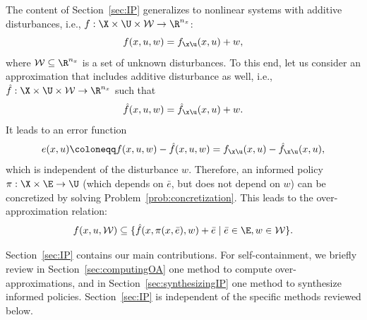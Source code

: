 \documentclass[letterpaper, 10 pt, conference]{ieeeconf}  %
\begin{document}
\begin{remark}
The content of Section~\ref{sec:IP} generalizes to nonlinear systems with additive disturbances, i.e., $f:\X\times\U\times\mathcal{W}\rightarrow\R^{n_x}$:
$$
f(x,u,w)= f_{\x\u}(x,u)+w,
$$
where $\mathcal{W}\subseteq\R^{n_x}$ is a set of unknown disturbances. To this end, let us consider an approximation that includes additive disturbance as well, i.e., $\hat{f}:\X\times\U\times\mathcal{W}\rightarrow\R^{n_x}$ such that
$$
\hat{f}(x,u,w)= \hat{f}_{\x\u}(x,u)+w.
$$
It leads to an error function
$$
e(x,u)\coloneqq f(x,u,w)-\hat{f}(x,u,w) = f_{\x\u}(x,u) - \hat{f}_{\x\u}(x,u),
$$
which is independent of the disturbance $w$. Therefore, an informed policy $\pi:\X\times\E\rightarrow\U$ (which depends on $\bar{e}$, but does not depend on $w$) can be concretized by solving Problem~\ref{prob:concretization}. This leads to the over-approximation relation:
$$
f(x,u,\mathcal{W})\subseteq \{ \hat{f}(x,\pi(x,\bar{e}),w)+\bar{e} \mid \bar{e}\in\E, w\in\mathcal{W} \}.
$$
\end{remark}

Section~\ref{sec:IP} contains our main contributions. For self-containment, we briefly review in Section~\ref{sec:computingOA} one method to compute over-approximations, and in Section~\ref{sec:synthesizingIP} one method to synthesize informed policies. Section~\ref{sec:IP} is independent of the specific methods reviewed below.
\end{document}
